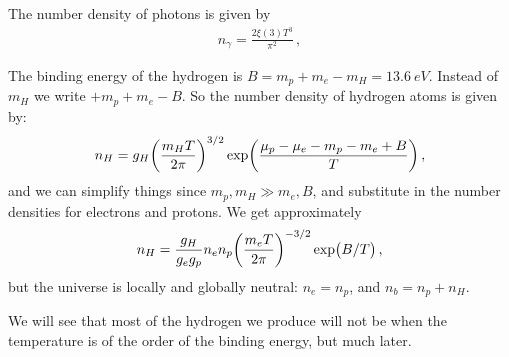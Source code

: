 \documentclass[main.tex]{subfiles}
\begin{document}
The number density of photons is given by 
%
\begin{align}
  n_{\gamma } = \frac{2 \xi(3) T^3}{\pi^2}
\,,
\end{align}
%

The binding energy of the hydrogen is \(B=m_p+m_e-m_H=\SI{13.6}{eV}\). Instead of \(m_H\) we write \(+m_p+m_e-B\). So the number density of hydrogen atoms is given by: 
%
\begin{align}
  n_H = g_H \qty(\frac{m_H T}{2 \pi })^{3/2} \exp(\frac{\mu_p - \mu_e - m_p - m_e + B}{T})
\,,
\end{align}
%
and we can simplify things since \(m_p, m_H \gg m_e, B\), and substitute in the number densities for electrons and protons.
We get approximately
%
\begin{align}
  n_H = \frac{g_H}{g_e g_p} n_e n_p \qty(\frac{m_e T}{2 \pi })^{-3/2}\exp(B/T)
\,,
\end{align}
%
but the universe is locally and globally neutral: \(n_e = n_p\), and \(n_b = n_p + n_H\). 

We will see that most of the hydrogen we produce will not be when the temperature is of the order of the binding energy, but much later.
\end{document}
